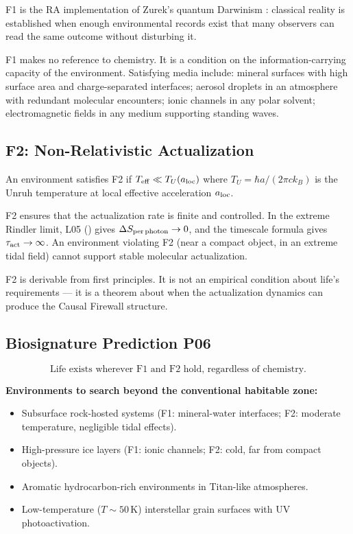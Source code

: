 \documentclass[12pt,a4paper]{article}
\begin{document}
F1 is the RA implementation of Zurek's quantum Darwinism \cite{Zurek2009}: classical reality is established when enough environmental records exist that many observers can read the same outcome without disturbing it.

F1 makes no reference to chemistry.  It is a condition on the information-carrying capacity of the environment.  Satisfying media include: mineral surfaces with high surface area and charge-separated interfaces; aerosol droplets in an atmosphere with redundant molecular encounters; ionic channels in any polar solvent; electromagnetic fields in any medium supporting standing waves.

\subsection{F2: Non-Relativistic Actualization}

\begin{definition}[Condition F2]
An environment satisfies \textup{F2} if $T_{\rm eff}\ll T_U(a_{\rm loc})$ where $T_U=\hbar a/(2\pi ck_B)$ is the Unruh temperature at local effective acceleration $a_{\rm loc}$.
\end{definition}

F2 ensures that the actualization rate is finite and controlled.  In the extreme Rindler limit, L05 (\statusLV) gives $\Delta S_{\rm per\,photon}\to0$, and the timescale formula gives $\tau_{\rm act}\to\infty$.  An environment violating F2 (near a compact object, in an extreme tidal field) cannot support stable molecular actualization.

F2 is derivable from first principles.  It is not an empirical condition about life's requirements --- it is a theorem about when the actualization dynamics can produce the Causal Firewall structure.

\subsection{Biosignature Prediction P06}

\begin{equation}
  \text{Life exists wherever F1 and F2 hold, regardless of chemistry.}
  \label{eq:P6}
\end{equation}

\textbf{Environments to search beyond the conventional habitable zone:}
\begin{itemize}
  \item Subsurface rock-hosted systems (F1: mineral-water interfaces; F2: moderate temperature, negligible tidal effects).
  \item High-pressure ice layers (F1: ionic channels; F2: cold, far from compact objects).
  \item Aromatic hydrocarbon-rich environments in Titan-like atmospheres.
  \item Low-temperature ($T\sim50\,\mathrm{K}$) interstellar grain surfaces with UV photoactivation.
\end{itemize}
\end{document}
